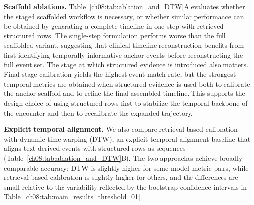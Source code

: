 








\noindent\textbf{Scaffold ablations.}
Table~\ref{ch08:tab:ablation_and_DTW}A evaluates whether the staged scaffolded workflow is necessary, or whether similar performance can be obtained by generating a complete timeline in one step with retrieved structured rows.
The single-step formulation performs worse than the full scaffolded variant, suggesting that clinical timeline reconstruction benefits from first identifying temporally informative anchor events before reconstructing the full event set.
The stage at which structured evidence is introduced also matters.
Final-stage calibration yields the highest event match rate, but the strongest temporal metrics are obtained when structured evidence is used both to calibrate the anchor scaffold and to refine the final assembled timeline.
This supports the design choice of using structured rows first to stabilize the temporal backbone of the encounter and then to recalibrate the expanded trajectory.





\noindent\textbf{Explicit temporal alignment.}
We also compare retrieval-based calibration with dynamic time warping (DTW), an explicit temporal-alignment baseline that aligns text-derived events with structured rows as sequences (Table~\ref{ch08:tab:ablation_and_DTW}B).
The two approaches achieve broadly comparable accuracy: DTW is slightly higher for some model--metric pairs, while retrieval-based calibration is slightly higher for others, and the differences are small relative to the variability reflected by the bootstrap confidence intervals in Table~\ref{ch08:tab:main_results_threshold_01}.  



\subsubsection{}
\label{ch08:sec:gap_results}


